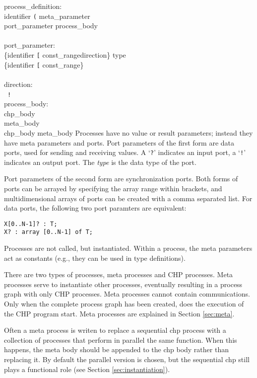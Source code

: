 \grammarstart
process\_definition: \\
       identifier {\tt{}(} meta\_parameter\SEQOPT {\tt{})} \\
      \>\qquad	{\tt{}(} port\_parameter\SEQOPT {\tt{})} process\_body \\
 \\
port\_parameter: \\
       \>\{identifier {\tt{}[} const\_range\LIST {\tt{}]}\OPT direction\}\LIST {\tt{}:} type \\
\orbox \>\{identifier {\tt{}[} const\_range\LIST {\tt{}]}\OPT \}\LIST \\
 \\
direction: \\
       \orbox \ {\tt{}!}
 \\
process\_body: \\
       \>chp\_body \\
\orbox \>meta\_body \\
\orbox \>chp\_body meta\_body
\grammarend
Processes have no value or result parameters; instead they have meta
parameters and ports.
Port parameters of the first form are data ports, used for sending and
receiving values. A `{\tt{}?}' indicates an input port, a `{\tt{}!}'
indicates an output port. The {\it{}type} is the data type of the port.

Port parameters of the second form are synchronization ports. Both forms
of ports can be arrayed by specifying the array range within brackets, and
multidimensional arrays of ports can be created with a comma separated list.
For data ports, the following two port paramters are equivalent:
\begin{verbatim}
X[0..N-1]? : T;
X? : array [0..N-1] of T;
\end{verbatim}

Processes are not called, but instantiated. Within a process,
the meta parameters act as constants (e.g., they can be used in
type definitions).

There are two types of processes, meta processes and CHP processes. Meta
processes serve to instantiate other processes, eventually resulting in
a process graph with only CHP processes. Meta processes cannot contain
communications. Only when the complete process graph has been created,
does the execution of the CHP program start. Meta processes are
explained in Section \ref{sec:meta}.

Often a meta process is writen to replace a sequential chp process with a
collection of processes that perform in parallel the same function.  When this
happens, the meta body should be appended to the chp body rather than replacing
it.  By default the parallel version is chosen, but the sequential chp still
plays a functional role (see Section \ref{sec:instantiation}).

